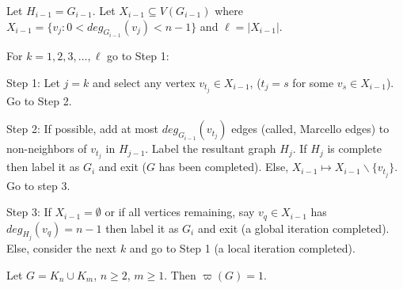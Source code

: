 \documentclass[10pt,a4paper]{amsart}
\begin{document}
\begin{definition}\label{def1}
Let $H_{i-1} = G_{i-1}$. Let $X_{i-1} \subseteq V(G_{i-1})$ where $X_{i-1} = \{v_j: 0 < deg_{G_{i-1}}(v_j) < n-1\}$ and $\ell = |X_{i-1}|$. 
 
For $k = 1,2,3,\dots, \ell$ go to Step 1: 

Step 1:  Let $j = k$ and select any vertex $v_{t_j} \in X_{i-1}$, ($t_j = s$ for some $v_s \in X_{i-1}$). Go to Step 2.

Step 2: If possible, add at most $deg_{G_{i-1}}(v_{t_j})$ edges (called, Marcello edges) to non-neighbors of $v_{t_j}$ in $H_{j-1}$. Label the resultant graph $H_j$. If $H_j$ is complete then label it as $G_i$ and exit ($G$ has been completed). Else, $X_{i-1}\mapsto X_{i-1}\backslash \{v_{t_j}\}$. Go to step 3.

Step 3: If $X_{i-1} = \emptyset$ or if all vertices remaining, say $v_q \in X_{i-1}$ has $deg_{H_j}(v_q) = n-1$ then label it as $G_i$ and exit (a global iteration completed). Else, consider the next $k$ and go to Step 1 (a local iteration completed).\\
\end{definition}

\begin{theorem}\label{thm2}
Let $G = K_n\cup K_m$, $n \geq 2$, $m \geq 1$. Then $\varpi(G) = 1$.
\end{theorem}
\end{document}
